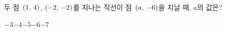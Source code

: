 두 점~$(1,\mkern3mu 4)$, $(-2,\mkern3mu -2)$를 지나는 직선이 점~$(a,\mkern3mu -6)$을 지날 때, $a$의 값은?
\begin{choices32}{$-3$}{$-4$}{$-5$}{$-6$}{$-7$}\end{choices32}
